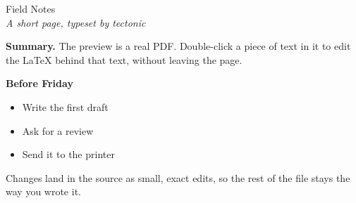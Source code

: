 \documentclass[12pt]{article}
\begin{document}
\begin{center}
  {\Large Field Notes}\\[6pt]
  \textit{A short page, typeset by tectonic}
\end{center}

\bigskip

\textbf{Summary.} The preview is a real PDF. Double-click a piece of text
in it to edit the LaTeX behind that text, without leaving the page.

\bigskip

\textbf{Before Friday}
\begin{itemize}[leftmargin=*]
  \item Write the first draft
  \item Ask for a review
  \item Send it to the printer
\end{itemize}

\bigskip

Changes land in the source as small, exact edits, so the rest of
the file stays the way you wrote it.
\end{document}
